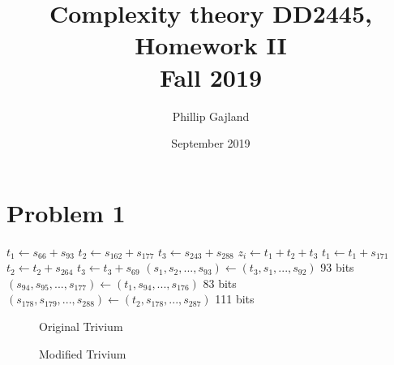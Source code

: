 \documentclass{article}
\title{Complexity theory DD2445, Homework II \\Fall 2019}
\author{Phillip Gajland}
\date{September 2019}
\begin{document}
    \maketitle

    \section*{Problem 1}


    \begin{center}
        \begin{minipage}{.7\linewidth}
            \begin{algorithm}[H]
                \begin{algorithmic}[1]

                    \State $t_1 \gets s_{66} + s_{93}$
                    \State $t_2 \gets s_{162} + s_{177}$
                    \State $t_3 \gets s_{243} + s_{288}$
                    \State
                    \State $z_i \gets t_1 + t_2 + t_3$
                    \State
                    \State $t_1 \gets t_1 + s_{171}$
                    \State $t_2 \gets t_2 + s_{264}$
                    \State $t_3 \gets t_3 + s_{69}$
                    \State
                    \State $(s_1,s_2,...,s_{93}) \gets (t_3,s_1,...,s_{92})$ 93 bits
                    \State $(s_{94},s_{95},...,s_{177}) \gets (t_1,s_{94},...,s_{176})$ 83 bits
                    \State $(s_{178},s_{179},...,s_{288}) \gets (t_2,s_{178},...,s_{287})$ 111 bits
                    \EndFor
                \end{algorithmic}
            \end{algorithm}
        \end{minipage}
    \end{center}

    \begin{figure}
        
        \caption{Original Trivium}
        \label{fig:tikz:my}
    \end{figure}


    \begin{figure}
        
        \caption{Modified Trivium}
        \label{fig:tikz:my}
    \end{figure}





    
    \nocite{*}
\end{document}
